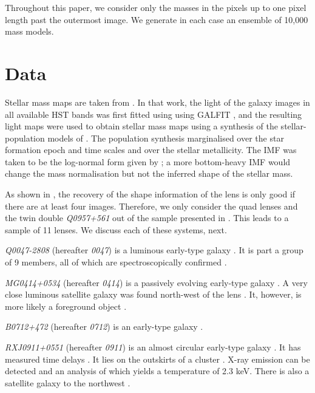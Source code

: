 \documentclass[useAMS,usenatbib]{mn2e}
\begin{document}
Throughout this paper, we consider only the masses in the pixels up to one pixel length past the outermost image. We generate in each case an ensemble of 10,000 mass models.

\section{Data}\label{sec:data}
Stellar mass maps are taken from \citep{2011ApJ...740...97L}. In that work, the light of the galaxy images in all available HST bands was first fitted using using GALFIT \citep{2002AJ....124..266P}, and the resulting light maps were used to obtain stellar mass maps using a synthesis of the stellar-population models of \citep{2003MNRAS.344.1000B}. The population synthesis marginalised over the star formation epoch and time scales and over the stellar metallicity. The IMF was taken to be the log-normal form given by \citep{2003PASP..115..763C}; a more bottom-heavy IMF would change the mass normalisation \citep[cf.][]{2014ApJ...793...96S} but not the inferred shape of the stellar mass.

As shown in \citep{2014arXiv1401.7990C}, the recovery of the shape information of the lens is only good if there are at least four images. Therefore, we only consider the quad lenses and the twin double \textit{Q0957+561} out of the sample presented in \citep{2011ApJ...740...97L}. This leads to a sample of 11 lenses. We discuss each of these systems, next.

\textit{Q0047-2808} (hereafter \textit{0047}) is a luminous early-type galaxy \citep{1996MNRAS.278..139W}. It is part a group of 9 members, all of which are spectroscopically confirmed \citep{2011ApJ...726...84W}.

\textit{MG0414+0534} (hereafter \textit{0414}) is a passively evolving early-type galaxy \citep{1999AJ....117.2034T}. A very close luminous satellite galaxy was found north-west of the lens \citep{1993AJ....105....1S}. It, however, is more likely a foreground object \citep{2011MNRAS.413L..86C}.

\textit{B0712+472} (hereafter \textit{0712}) is an early-type galaxy \citep{1998AJ....115..377F}.

\textit{RXJ0911+0551} (hereafter \textit{0911}) is an almost circular early-type galaxy \citep{2012A&A...538A..99S}. It has measured time delays \citep{2002ApJ...572L..11H}. It lies on the outskirts of a cluster \citep{2001ApJ...555....1M}. X-ray emission can be detected and an analysis of which yields a temperature of 2.3 keV. There is also a satellite galaxy to the northwest \citep{2000ApJ...544L..35K}.
\end{document}

